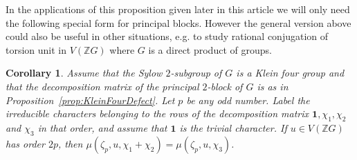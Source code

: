 \documentclass[11pt, a4paper]{amsart}
\newtheorem{corollary}[theorem]{Corollary}
\theoremstyle{definition}
\theoremstyle{definition}
\begin{document}
In the applications of this proposition given later in this article we will only need the following special form for principal blocks. However the general version above could also be useful in other situations, e.g. to study rational conjugation of torsion unit in $V(\mathbb{Z}G)$ where $G$ is a direct product of groups.

\begin{corollary}\label{cor:KleinFourDefect}
Assume that the Sylow $2$-subgroup of $G$ is a Klein four group and that the decomposition matrix of the principal $2$-block of $G$ is as in Proposition~\ref{prop:KleinFourDefect}.
Let $p$ be any odd number. Label the irreducible characters belonging to the rows of the decomposition matrix $\mathbf{1}, \chi_1,\chi_2$ and $\chi_3$ in that order, and assume that $\mathbf{1}$ is the trivial character. If $u \in V(\mathbb{Z}G)$ has order $2p$, then $\mu(\zeta_p, u, \chi_1+\chi_2) = \mu(\zeta_p, u, \chi_3)$.
\end{corollary}
\end{document}
